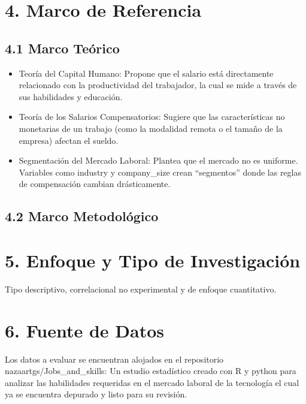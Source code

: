 \documentclass[oneside,11pt]{Latex/Classes/PhDthesisPSnPDF}
\begin{document}
\section{4. Marco de Referencia}\label{marco-de-referencia}

\subsection{4.1 Marco Teórico}\label{marco-teuxf3rico}

\begin{itemize}
\tightlist
\item
  Teoría del Capital Humano: Propone que el salario está directamente
  relacionado con la productividad del trabajador, la cual se mide a
  través de sus habilidades y educación.
\item
  Teoría de los Salarios Compensatorios: Sugiere que las características
  no monetarias de un trabajo (como la modalidad remota o el tamaño de
  la empresa) afectan el sueldo.
\item
  Segmentación del Mercado Laboral: Plantea que el mercado no es
  uniforme. Variables como industry y company\_size crean ``segmentos''
  donde las reglas de compensación cambian drásticamente.
\end{itemize}

\subsection{4.2 Marco Metodológico}\label{marco-metodoluxf3gico}

\section{5. Enfoque y Tipo de
Investigación}\label{enfoque-y-tipo-de-investigaciuxf3n}

Tipo descriptivo, correlacional no experimental y de enfoque
cuantitativo.

\section{6. Fuente de Datos}\label{fuente-de-datos}

Los datos a evaluar se encuentran alojados en el repositorio
nazaartgs/Jobs\_and\_skills: Un estudio estadístico creado con R y
python para analizar las habilidades requeridas en el mercado laboral de
la tecnología el cual ya se encuentra depurado y listo para su revisión.
\end{document}
